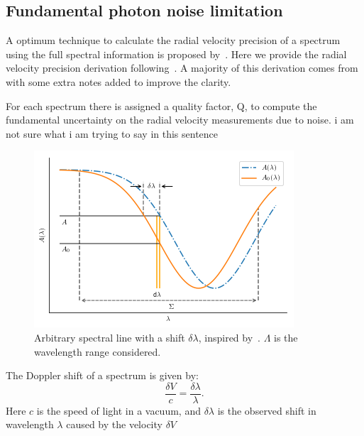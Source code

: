 \subsection{Fundamental photon noise limitation}

A optimum technique to calculate the radial velocity precision of a spectrum using the full spectral information is proposed by~\citet{Connes1985}. Here we provide the radial velocity precision derivation following~\citet{Connes1985, bouchy_fundamental_2001, figueira_radial_2016}. A majority of this derivation comes from~\citet{bouchy_fundamental_2001} with some extra notes added to improve the clarity.

For each spectrum there is assigned a quality factor, Q, to compute the fundamental uncertainty on the radial velocity measurements due to noise. {\red{} i am not sure what i am trying to say in this sentence}

\begin{figure}
    \centering
    \includegraphics[width=0.7\linewidth]{figures/precision_derivation.png}
    \caption{Arbitrary spectral line with a shift \(\delta \lambda\), inspired by~\citet{Connes1985}.  \(\Lambda\) is the wavelength range considered.}
    \label{fig:precisionderivation}
\end{figure}

The Doppler shift of a spectrum is given by:
\begin{equation}
\frac{\delta V}{c} = \frac{\delta \lambda}{\lambda}.
\label{eq:dopplershift}
\end{equation}
Here \(c\) is the speed of light in a vacuum, and \(\delta \lambda\) is the observed shift in wavelength \(\lambda\) caused by the velocity \(\delta V\)

